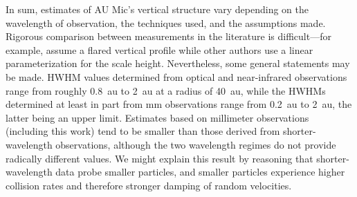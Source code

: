 \documentclass[modern]{aastex62}
\begin{document}
In sum, estimates of AU Mic's vertical structure vary depending on the wavelength of observation, the techniques used, and the assumptions made.
Rigorous comparison between measurements in the literature is difficult---for example, \citet{krist05} assume a flared vertical profile while other authors use a linear parameterization for the scale height.
Nevertheless, some general statements may be made.
HWHM values determined from optical and near-infrared observations range from roughly \SI{0.8}{au} to \SI{2}{au} at a radius of \SI{40}{au}, while the HWHMs determined at least in part from mm observations range from \SI{0.2}{au} to \SI{2}{au}, the latter being an upper limit. 
%
%
Estimates based on millimeter observations (including this work) tend to be smaller than those derived from shorter-wavelength observations, although the two wavelength regimes do not provide radically different values.
We might explain this result by reasoning that
shorter-wavelength data probe smaller particles, and smaller particles experience
higher collision rates and therefore stronger damping of random velocities.
\end{document}
